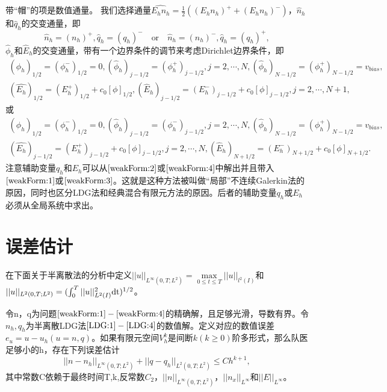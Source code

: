 \documentclass[lang=cn,newtx,10pt,scheme=chinese]{elegantbook}
\begin{document}
带“帽”的项是数值通量。 我们选择通量$\hat{E_h n_h} = \frac{1}{2}((E_hn_h)^+  + (E_hn_h)^-)$，$\hat{n}_h$和$\hat{q}_h$的交变通量，即
\begin{equation}
    \hat{n}_h = (n_h)^+, \hat{q}_h = (q_h)^- \quad \text{or} \quad \hat{n}_h = (n_h)^-, \hat{q}_h = (q_h)^+, \label{numbericalFlux:n&q}
\end{equation}
$\hat{\phi}_h$和$\hat{E}_h$的交变通量，带有一个边界条件的调节来考虑Dirichlet边界条件，即
\begin{equation}
    \begin{aligned}
        (\hat{\phi}_h)_{1/2} = (\phi_h^-)_{1/2} = 0, (\hat{\phi}_h)_{j-1/2} = (\phi_h^+)_{j-1/2},j = 2,\cdots,N,(\hat{\phi}_h)_{N-1/2} = (\phi_h^+)_{N-1/2} = v_{bias}, \\
        (\hat{E_h})_{1/2} = (E_h^+)_{1/2} + c_0[\phi]_{1/2}, (\hat{E}_h)_{j-1/2} = (E_h^-)_{j-1/2} + c_0[\phi]_{j-1/2},j = 2,\cdots,N+1,
    \end{aligned}\label{numbericalFlux:phi&E}
\end{equation}
或
\begin{equation}
    \begin{aligned}
        (\hat{\phi}_h)_{1/2} = (\phi_h^-)_{1/2} = 0, (\hat{\phi}_h)_{j-1/2} = (\phi_h^-)_{j-1/2},j = 2,\cdots,N,(\hat{\phi}_h)_{N-1/2} = (\phi_h^+)_{N-1/2} = v_{bias}, \\
        (\hat{E_h})_{j - 1/2} = (E_h^+)_{j - 1/2} + c_0[\phi]_{j-1/2},j = 2,\cdots,N, (\hat{E}_h)_{N+1/2} = (E_h^-)_{N+1/2} + c_0[\phi]_{N+1/2}.
    \end{aligned}\label{numbericalFlux:phi&E alt}
\end{equation}
注意辅助变量$q_h$和$E_h$可以从$\ref{weakForm:2}$或$\ref{weakForm:4}$中解出并且带入$\ref{weakForm:1}$或$\ref{weakForm:3}$。这就是这种方法被叫做“局部”不连续Galerkin法的原因，同时也区分LDG法和经典混合有限元方法的原因。后者的辅助变量$q_h$或$E_h$必须从全局系统中求出。

\section{误差估计}
在下面关于半离散法的分析中定义$||u||_{L^{\infty}(0,T;L^2)}  = \max \limits_{0 \leq t \leq T}||u||_{l^2(I)}$和$||u||_{L^2(0,T;L^2)} = (\int_{0}^{T}||u||_{L^2(I)}^2\rm{d}t)^{1/2}$。
\begin{theorem}
    令n，q为问题$\ref{weakForm:1}-\ref{weakForm:4}$的精确解，且足够光滑，导数有界。令$n_h,q_h$为半离散LDG法$\ref{LDG:1}-\ref{LDG:4}$的数值解。定义对应的数值误差$e_u = u - u_h (u = n,q)$。如果有限元空间$V_h^k$是间断$k(k\geq 0)$阶多形式，那么队医足够小的h，存在下列误差估计
    \begin{equation}
        ||n - n_h||_{L^{\infty}(0,T;L^2)} + ||q - q_h||_{L^2(0,T;L^2)} \leq C h^{k+1},
    \end{equation}
    其中常数C依赖于最终时间T,k,反常数$C_2$，$||n||_{L^{\infty}(0,T;L^2)}$，$||n_x||_{L^{\infty}}$和$||E||_{L^{\infty}}$。
\end{theorem}
\end{document}
